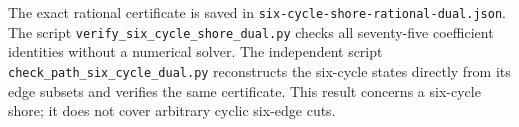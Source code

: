 The exact rational certificate is saved in \texttt{six-cycle-shore-rational-dual.json}.
The script \texttt{verify\_six\_cycle\_shore\_dual.py} checks all seventy-five coefficient identities without a numerical solver.
The independent script \texttt{check\_path\_six\_cycle\_dual.py} reconstructs the six-cycle states directly from its edge subsets and verifies the same certificate.
This result concerns a six-cycle shore; it does not cover arbitrary cyclic six-edge cuts.
